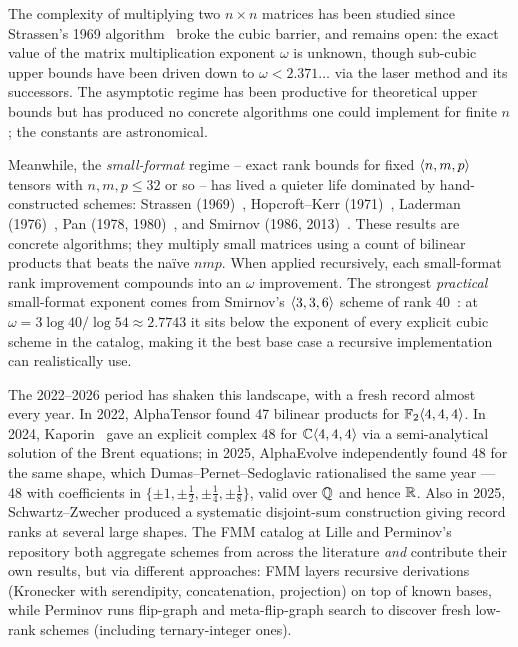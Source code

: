 
The complexity of multiplying two \(n \times n\) matrices has been
studied since Strassen's 1969 algorithm~\cite{strassen1969} broke the cubic barrier, and
remains open: the exact value of the matrix multiplication exponent
\(\omega\) is unknown, though sub-cubic upper bounds have been driven
down to \(\omega < 2.371\ldots\) via the laser method and its
successors. The asymptotic regime has been productive for theoretical
upper bounds but has produced no concrete algorithms one could implement
for finite \(n\); the constants are astronomical.

Meanwhile, the \emph{small-format} regime -- exact rank bounds for
fixed \(\langle n, m, p \rangle\) tensors with \(n, m, p \le 32\) or so --
has lived a quieter life dominated by hand-constructed schemes:
Strassen (1969)~\cite{strassen1969}, Hopcroft--Kerr
(1971)~\cite{hopcroftkerr1971}, Laderman (1976)~\cite{laderman1976},
Pan (1978, 1980)~\cite{pan1978,pan1980}, and Smirnov (1986,
2013)~\cite{smirnov1986,smirnov2013}. These results are concrete
algorithms; they multiply small matrices using a count of bilinear
products that beats the naïve \(nmp\). When applied recursively, each
small-format rank improvement compounds into an \(\omega\)
improvement. The strongest \emph{practical} small-format exponent comes
from Smirnov's \(\langle 3, 3, 6 \rangle\) scheme of rank
40~\cite{smirnov2013}: at \(\omega = 3\log 40 / \log 54 \approx
2.7743\) it sits below the exponent of every explicit cubic scheme in
the catalog, making it the best base case a recursive implementation
can realistically use.

The 2022--2026 period has shaken this landscape, with a fresh record
almost every year. In 2022, AlphaTensor \cite{alphatensor2022} found 47
bilinear products for \(\mathbb{F}_2\langle 4, 4, 4 \rangle\). In 2024,
Kaporin~\cite{kaporin2024brent} gave an explicit complex 48 for
\(\mathbb{C}\langle 4, 4, 4 \rangle\) via a semi-analytical solution of the
Brent equations; in 2025, AlphaEvolve \cite{alphaevolve2025}
independently found 48 for the same shape, which
Dumas--Pernet--Sedoglavic \cite{dps2025} rationalised the same year ---
48 with coefficients in \(\{\pm1,\pm\tfrac12,\pm\tfrac14,\pm\tfrac18\}\),
valid over \(\mathbb{Q}\) and hence \(\mathbb{R}\). Also in 2025,
Schwartz--Zwecher \cite{schwartzzwecher2025} produced a systematic
disjoint-sum construction giving record ranks at several large shapes. The FMM
catalog at Lille \cite{fmmlille} and Perminov's
 repository \cite{perminov} both
aggregate schemes from across the literature \emph{and} contribute
their own results, but via different approaches: FMM layers recursive
derivations (Kronecker with serendipity, concatenation, projection) on top of
known bases, while Perminov runs flip-graph and meta-flip-graph search
to discover fresh low-rank schemes (including ternary-integer ones).

